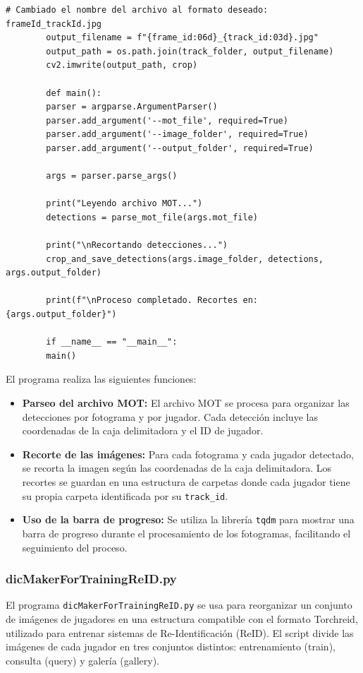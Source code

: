 \documentclass[12pt, a4paper, twoside]{article}
\begin{document}
\begin{lstlisting}[style=pythonstyle]
		# Cambiado el nombre del archivo al formato deseado: frameId_trackId.jpg
		output_filename = f"{frame_id:06d}_{track_id:03d}.jpg"
		output_path = os.path.join(track_folder, output_filename)
		cv2.imwrite(output_path, crop)
		
		def main():
		parser = argparse.ArgumentParser()
		parser.add_argument('--mot_file', required=True)
		parser.add_argument('--image_folder', required=True)
		parser.add_argument('--output_folder', required=True)
		
		args = parser.parse_args()
		
		print("Leyendo archivo MOT...")
		detections = parse_mot_file(args.mot_file)
		
		print("\nRecortando detecciones...")
		crop_and_save_detections(args.image_folder, detections, args.output_folder)
		
		print(f"\nProceso completado. Recortes en: {args.output_folder}")
		
		if __name__ == "__main__":
		main()
	\end{lstlisting}
	\vspace{0.5cm}
	
	El programa realiza las siguientes funciones:
	
	\begin{itemize}
		\item \textbf{Parseo del archivo MOT:} El archivo MOT se procesa para organizar las detecciones por fotograma y por jugador. Cada detección incluye las coordenadas de la caja delimitadora y el ID de jugador.
		\item \textbf{Recorte de las imágenes:} Para cada fotograma y cada jugador detectado, se recorta la imagen según las coordenadas de la caja delimitadora. Los recortes se guardan en una estructura de carpetas donde cada jugador tiene su propia carpeta identificada por su \texttt{track\_id}.
		\item \textbf{Uso de la barra de progreso:} Se utiliza la librería \texttt{tqdm} para mostrar una barra de progreso durante el procesamiento de los fotogramas, facilitando el seguimiento del proceso.
	\end{itemize}
	
	
	\subsubsection{dicMakerForTrainingReID.py}
	
	El programa \texttt{dicMakerForTrainingReID.py} se usa para reorganizar un conjunto de imágenes de jugadores en una estructura compatible con el formato Torchreid, utilizado para entrenar sistemas de Re-Identificación (ReID). El script divide las imágenes de cada jugador en tres conjuntos distintos: entrenamiento (train), consulta (query) y galería (gallery).
	
\end{document}
